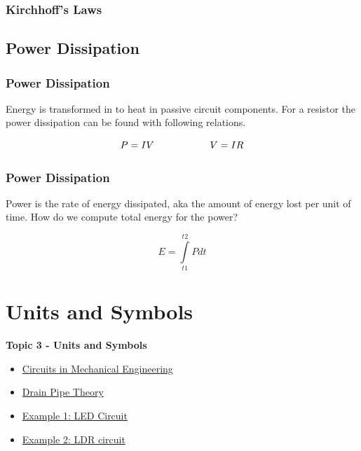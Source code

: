 \documentclass[fleqn]{beamer} %
\newcommand{\sectionIIItitle}{Units and Symbols}
\newcommand{\sectionIIsubsectionIIItitle}{Kirchhoff's Laws}
\newcommand{\sectionIIsubsectionIVtitle}{Power Dissipation}
\newcommand{\sectionIIIsubsectionItitle}{Circuits in Mechanical Engineering}
\newcommand{\sectionIIIsubsectionIItitle}{Drain Pipe Theory}
\newcommand{\sectionIIIsubsectionIIItitle}{Example 1: LED Circuit}
\newcommand{\sectionIIIsubsectionIVtitle}{Example 2: LDR circuit}
\begin{document}
			\begin{frame}
			\frametitle{\sectionIIsubsectionIIItitle}


			\end{frame}

		\subsection{\sectionIIsubsectionIVtitle}\label{sectionIIsubsectionIV}

			\begin{frame}
				\frametitle{\sectionIIsubsectionIVtitle}

				Energy is transformed in to heat in passive circuit components. For a resistor the power dissipation can be found with following relations. \vspace{5mm}
	
				\[P=IV \hspace{20mm} V=IR \]

			\end{frame}

			\begin{frame}
				\frametitle{\sectionIIsubsectionIVtitle}

				Power is the rate of energy dissipated, aka the amount of energy lost per unit of time. How do we compute total energy for the power? 
	
				\[E=\int\limits_{t1}^{t2}Pdt \]  

			\end{frame}
		
	\section{\sectionIIItitle}\label{sectionIII}

		\begin{frame}
			\large \textbf{Topic 3 - \sectionIIItitle} \vspace{3mm}\\

			\begin{itemize}
				\item \hyperlink{sectionIIIsubsectionI}{\sectionIIIsubsectionItitle} \vspc %
				\item \hyperlink{sectionIIIsubsectionII}{\sectionIIIsubsectionIItitle} \vspc %
				\item \hyperlink{sectionIIIsubsectionIII}{\sectionIIIsubsectionIIItitle} \vspc %
				\item \hyperlink{sectionIIIsubsectionIV}{\sectionIIIsubsectionIVtitle} \vspc %
			\end{itemize}

		\end{frame}
\end{document}
